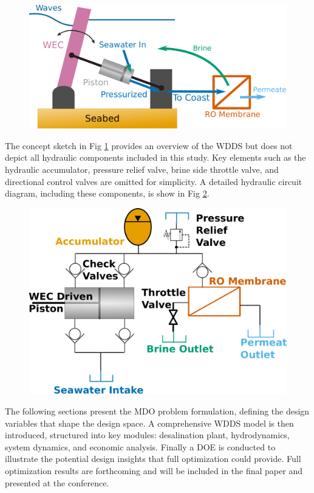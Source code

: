 \documentclass[twocolumn,10pt]{asme2e}
\begin{document}
\begin{figure}[b!]
    \includegraphics[width=\linewidth]{../figs/wdds.pdf}
    \label{fig:WDDS}
\end{figure}

The concept sketch in Fig \ref{fig:WDDS} provides an overview of the WDDS but does not depict all hydraulic components included in this study. Key elements such as the hydraulic accumulator, pressure relief valve, brine side throttle valve, and directional control valves are omitted for simplicity. A detailed hydraulic circuit diagram, including these components, is show in Fig \ref{fig:hydraulics}.

\begin{figure}[t!]
    \centering
    \includegraphics[width=0.7\linewidth]{../figs/hydraulic_circuit.pdf}
    \label{fig:hydraulics}
\end{figure}

The following sections present the MDO problem formulation, defining the design variables that shape the design space. A comprehensive WDDS model is then introduced, structured into key modules: desalination plant, hydrodynamics, system dynamics, and economic analysis. Finally a DOE is conducted to illustrate the potential design insights that full optimization could provide. Full optimization results are forthcoming and will be included in the final paper and presented at the conference.
\end{document}
